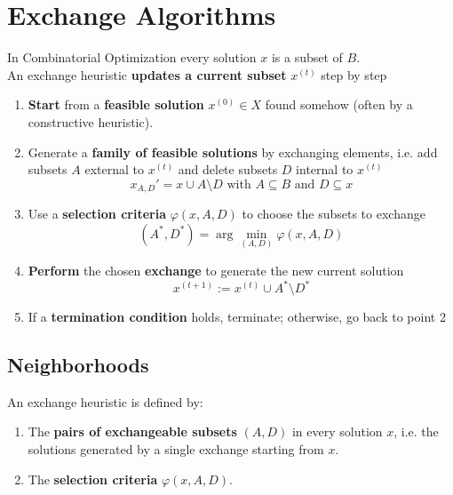 \section{Exchange Algorithms}

In Combinatorial Optimization every solution $x$ is a subset of $B$.\\

An exchange heuristic \textbf{updates a current subset} $x^{(t)}$ step by step

\begin{enumerate}
	\item \textbf{Start} from a \textbf{feasible solution} $x^{(0)} \in X$ found somehow (often by a constructive heuristic).\\
	
	\item Generate a \textbf{family of feasible solutions} by exchanging elements, i.e. add subsets $A$ external to $x^{(t)}$ and delete subsets $D$ internal to $x^{(t)}$
	$$ x_{A,D}' = x \cup A \setminus D \text{ with } A \subseteq B \text{ and } D \subseteq x $$
	
	\item Use a \textbf{selection criteria} $\varphi (x, A, D)$ to choose the subsets to exchange
	$$ (A^\ast, D^\ast) = \arg \min_{(A,D)} \varphi (x, A, D) $$
	
	\item \textbf{Perform} the chosen \textbf{exchange} to generate the new current solution
	$$ x^{(t+1)} := x^{(t)} \cup A^\ast \setminus D^\ast $$
	
	\item If a \textbf{termination condition} holds, terminate; otherwise, go back to point 2
\end{enumerate}

\newpage

\subsection{Neighborhoods} 

An exchange heuristic is defined by:
\begin{enumerate}
	\item The \textbf{pairs of exchangeable subsets} $(A, D)$ in every solution $x$, i.e. the solutions generated by a single exchange starting from $x$.\\
	
	\item The \textbf{selection criteria} $\varphi (x, A, D)$.\\
\end{enumerate}

